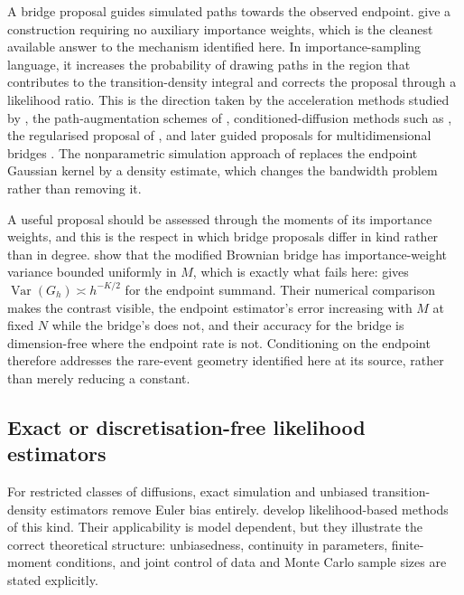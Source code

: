 \documentclass[11pt]{article}
\theoremstyle{definition}
\newcommand{\Var}{\operatorname{Var}}
\begin{document}
A bridge proposal guides simulated paths towards the observed endpoint. \citet{BladtSorensen2014} give a construction requiring no auxiliary importance weights, which is the cleanest available answer to the mechanism identified here. In importance-sampling language, it increases the probability of drawing paths in the region that contributes to the transition-density integral and corrects the proposal through a likelihood ratio. This is the direction taken by the acceleration methods studied by \citet{DurhamGallant2002}, the path-augmentation schemes of \citet{ElerianChibShephard2001}, conditioned-diffusion methods such as \citet{DelyonHu2006}, the regularised proposal of \citet{Lindstrom2012}, and later guided proposals for multidimensional bridges \citep{SchauerEtAl2017,VanDerMeulenSchauer2017}. The nonparametric simulation approach of \citet{Nicolau2002} replaces the endpoint Gaussian kernel by a density estimate, which changes the bandwidth problem rather than removing it.

A useful proposal should be assessed through the moments of its importance weights, and this is the respect in which bridge proposals differ in kind rather than in degree. \citet{StramerYan2007a} show that the modified Brownian bridge has importance-weight variance bounded uniformly in $M$, which is exactly what fails here:  gives $\Var(G_h)\asymp h^{-K/2}$ for the endpoint summand. Their numerical comparison makes the contrast visible, the endpoint estimator's error increasing with $M$ at fixed $N$ while the bridge's does not, and their accuracy for the bridge is dimension-free where the endpoint rate is not. Conditioning on the endpoint therefore addresses the rare-event geometry identified here at its source, rather than merely reducing a constant.

\subsection{Exact or discretisation-free likelihood estimators}

For restricted classes of diffusions, exact simulation and unbiased transition-density estimators remove Euler bias entirely. \citet{BeskosEtAl2006,BeskosEtAl2009} develop likelihood-based methods of this kind. Their applicability is model dependent, but they illustrate the correct theoretical structure: unbiasedness, continuity in parameters, finite-moment conditions, and joint control of data and Monte Carlo sample sizes are stated explicitly.
\end{document}
